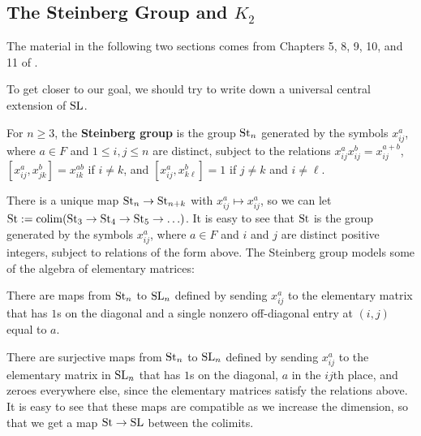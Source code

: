 \subsection{The Steinberg Group and $K_2$}
The material in the following two sections comes from Chapters 5, 8, 9, 10, and 11 of \cite{MilnorK}.

To get closer to our goal, we should try to write down a universal central extension of $\mathrm{SL}$.
\begin{definition}
    For $n \geq 3$, the \textbf{Steinberg group} is the group $\mathrm{St}_n$ generated by the symbols $x_{ij}^a$, where $a \in F$ and $1 \leq i, j \leq n$ are distinct, subject to the relations $x_{ij}^a x_{ij}^b = x_{ij}^{a + b}$, $[x_{ij}^a, x_{jk}^b] = x_{ik}^{ab}$ if $i \neq k$, and $[x_{ij}^a, x_{k\ell}^b] = 1$ if $j \neq k$ and $i \neq \ell$.
\end{definition}
There is a unique map $\mathrm{St}_n \to \mathrm{St}_{n + k}$ with $x_{ij}^a \mapsto x_{ij}^a$, so we can let $\mathrm{St} := \mathrm{colim} (\mathrm{St}_3 \to \mathrm{St}_4 \to \mathrm{St}_5 \to \ldots)$. It is easy to see that $\mathrm{St}$ is the group generated by the symbols $x_{ij}^a$, where $a \in F$ and $i$ and $j$ are distinct positive integers, subject to relations of the form above. The Steinberg group models some of the algebra of elementary matrices:
\begin{lemma}
    There are maps from $\mathrm{St}_n$ to $\mathrm{SL}_n$ defined by sending $x_{ij}^a$ to the elementary matrix that has $1$s on the diagonal and a single nonzero off-diagonal entry at $(i, j)$ equal to $a$.
\end{lemma}

There are surjective maps from $\mathrm{St}_n$ to $\mathrm{SL}_n$ defined by sending $x_{ij}^a$ to the elementary matrix in $\mathrm{SL}_n$ that has $1$s on the diagonal, $a$ in the $ij$th place, and zeroes everywhere else, since the elementary matrices satisfy the relations above. It is easy to see that these maps are compatible as we increase the dimension, so that we get a map $\mathrm{St} \to \mathrm{SL}$ between the colimits.

